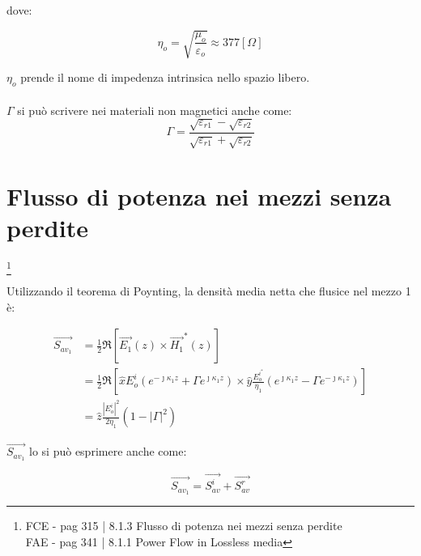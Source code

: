 dove: 

{\Large \begin{equation}
    \eta_o = \sqrt{\frac{\mu_o}{\varepsilon_o}} \approx 377 [\Omega] 
\end{equation}}

$\eta_o$ prende il nome di impedenza intrinsica nello spazio libero. \\ \\ 

$\Gamma$ si può scrivere nei materiali non magnetici anche come: \\

{\Large \begin{equation}
    \Gamma = \frac{\sqrt{\varepsilon_{r1}} - \sqrt{\varepsilon_{r2}}}{ \sqrt{\varepsilon_{r1}} + \sqrt{\varepsilon_{r2}}}
\end{equation}}

\newpage 

\section{Flusso di potenza nei mezzi senza perdite} 

\footnote{FCE - pag 315 | 8.1.3 Flusso di potenza nei mezzi senza perdite \\ 
FAE - pag 341 | 8.1.1 Power Flow in Lossless media}

Utilizzando il teorema di Poynting, la densità media netta che flusice nel mezzo 1 è: 

{\Large \begin{equation}
    \begin{split}
        \vec{S_{av_1}} &= \frac{1}{2} \Re [\vec{E_1}(z) \times \vec{H_1} ^ {*} (z) ] 
        \\
        &= \frac{1}{2} \Re [\hat{x} E_o ^{i} (e^{-\jmath \kappa_1 z} + \Gamma e^{\jmath \kappa_1 z}) \times  \hat{y} \frac{E_o ^{i^*}}{\eta_1} (e^{\jmath \kappa_1 z} - \Gamma e^{-\jmath \kappa_1 z})]\\ 
        &= \hat{z} \frac{\left|E_o ^{i}\right| ^{2}}{2 \eta_1} (1 - \left|\Gamma\right| ^{2})    
    \end{split}
\end{equation}} 

$\vec{S_{av_1}}$ lo si può esprimere anche come: 

{\Large \begin{equation}
    \vec{S_{av_1}} = \vec{S_{av} ^{i}} + \vec{S_{av} ^{r}}    
\end{equation}} 


